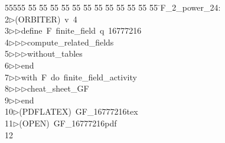 %
%
\begin{tabbing}
55555 \= 55 \= 55 \= 55 \= 55 \= 55 \= 55 \= 55 \= 55 \= 55 \= 55 \= 55 \= 55 \= \>F\_2\_power\_24:\\[0pt]
2\>$\triangleright$\>(ORBITER)\ v\ 4\ \\[0pt]
3\>$\triangleright$\>$\triangleright$\>define\ F\ finite\_field\ q\ 16777216\ \\[0pt]
4\>$\triangleright$\>$\triangleright$\>$\triangleright$\>compute\_related\_fields\ \\[0pt]
5\>$\triangleright$\>$\triangleright$\>$\triangleright$\>without\_tables\ \\[0pt]
6\>$\triangleright$\>$\triangleright$\>end\ \\[0pt]
7\>$\triangleright$\>$\triangleright$\>with\ F\ do\ finite\_field\_activity\ \\[0pt]
8\>$\triangleright$\>$\triangleright$\>$\triangleright$\>cheat\_sheet\_GF\ \\[0pt]
9\>$\triangleright$\>$\triangleright$\>end\\[0pt]
10\>$\triangleright$\>(PDFLATEX)\ GF\_16777216tex\\[0pt]
11\>$\triangleright$\>(OPEN)\ GF\_16777216pdf\\[0pt]
12\>\end{tabbing}
